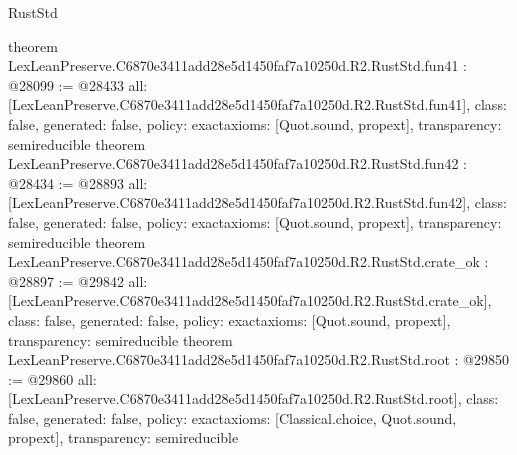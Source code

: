 \begin{lexlean}{RustStd}
\begin{coremodule}
{}
theorem LexLeanPreserve.C6870e3411add28e5d1450faf7a10250d.R2.RustStd.fun41 : @28099 := @28433 {
  all: [LexLeanPreserve.C6870e3411add28e5d1450faf7a10250d.R2.RustStd.fun41],
  class: false,
  generated: false,
  policy: exact{axioms: [Quot.sound, propext]},
  transparency: semireducible
}
theorem LexLeanPreserve.C6870e3411add28e5d1450faf7a10250d.R2.RustStd.fun42 : @28434 := @28893 {
  all: [LexLeanPreserve.C6870e3411add28e5d1450faf7a10250d.R2.RustStd.fun42],
  class: false,
  generated: false,
  policy: exact{axioms: [Quot.sound, propext]},
  transparency: semireducible
}
theorem LexLeanPreserve.C6870e3411add28e5d1450faf7a10250d.R2.RustStd.crate_ok : @28897 := @29842 {
  all: [LexLeanPreserve.C6870e3411add28e5d1450faf7a10250d.R2.RustStd.crate_ok],
  class: false,
  generated: false,
  policy: exact{axioms: [Quot.sound, propext]},
  transparency: semireducible
}
theorem LexLeanPreserve.C6870e3411add28e5d1450faf7a10250d.R2.RustStd.root : @29850 := @29860 {
  all: [LexLeanPreserve.C6870e3411add28e5d1450faf7a10250d.R2.RustStd.root],
  class: false,
  generated: false,
  policy: exact{axioms: [Classical.choice, Quot.sound, propext]},
  transparency: semireducible
}


\end{coremodule}
\end{lexlean}
